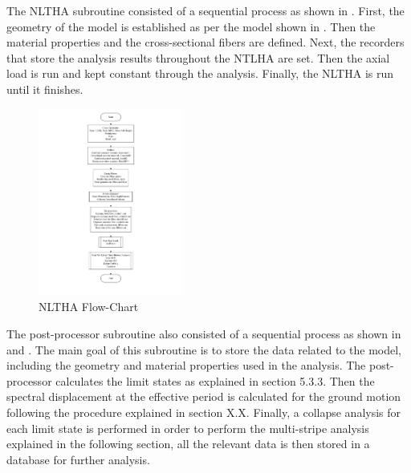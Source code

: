 The NLTHA subroutine consisted of a sequential process as shown in . First, the geometry of the model is established as per the model shown in . Then the material properties and the cross-sectional fibers are defined. Next, the recorders that store the analysis results throughout the NTLHA are set. Then the axial load is run and kept constant through the analysis. Finally, the NLTHA is run until it finishes.

\begin{figure}[htp]
	\centering
	\includegraphics[width=0.425\textwidth]{VAC Thesis 2.0/Chapter-5/figs/NLTHA_FlowCharts_01.pdf}
	\caption{NLTHA Flow-Chart}
	\label{fig:nltha_flowchart}
\end{figure}

The post-processor subroutine also consisted of a sequential process as shown in  and  . The main goal of this subroutine is to store the data related to the model, including the geometry and material properties used in the analysis. The post-processor calculates the limit states as explained in section 5.3.3. Then the spectral displacement at the effective period is calculated for the ground motion following the procedure explained in section X.X. Finally, a collapse analysis for each limit state is performed in order to perform the multi-stripe analysis explained in the following section, all the relevant data is then stored in a database for further analysis.

